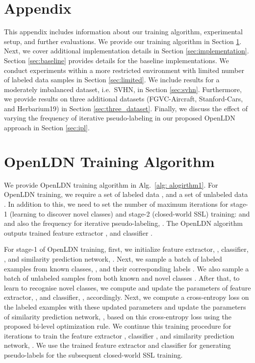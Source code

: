 \documentclass[runningheads]{eccv2022submission}
\begin{document}
\clearpage

\appendix
\section*{Appendix}
This appendix includes information about our training algorithm, experimental setup, and further evaluations. We provide our training algorithm in Section \ref{sec:algorithm}. Next, we cover additional implementation details in Section \ref{sec:implementation}. Section \ref{sec:baseline} provides details for the baseline implementations. We conduct experiments within a more restricted environment with limited number of labeled data samples in Section \ref{sec:limited}. We include results for a moderately imbalanced dataset, i.e.\ SVHN, in Section \ref{sec:svhn}. Furthermore, we provide results on three additional datasets (FGVC-Aircraft, Stanford-Cars, and Herbarium19) in Section \ref{sec:three_dataset}. Finally, we discuss the effect of varying the frequency of iterative pseudo-labeling in our proposed OpenLDN approach in Section \ref{sec:ipl}.


\section{OpenLDN Training Algorithm}
\label{sec:algorithm}
We provide OpenLDN training algorithm in Alg.~\ref{alg: alogirthm1}. For OpenLDN training, we require a set of labeled data , and a set of unlabeled data . In addition to this, we need to set the number of maximum iterations for stage-1 (learning to discover novel classes) and stage-2 (closed-world SSL) training:  and  and also the frequency for iterative pseudo-labeling, . The OpenLDN algorithm outputs trained feature extractor , and classifier .

For stage-1 of OpenLDN training, first, we initialize feature extractor, , classifier, , and similarity prediction network, . Next, we sample a batch of labeled examples from known classes, , and their corresponding labels . We also sample a batch of unlabeled samples from both known and novel classes . After that, to learn to recognise novel classes, we compute  and update the parameters of feature extractor, , and classifier, , accordingly. Next, we compute a cross-entropy loss on the labeled examples with these updated parameters and update the parameters of similarity prediction network, , based on this cross-entropy loss using the proposed bi-level optimization rule. We continue this training procedure for  iterations to train the feature extractor , classifier , and similarity prediction network, . We use the trained feature extractor  and classifier  for generating pseudo-labels for the subsequent closed-world SSL training.              
\end{document}
